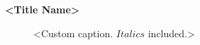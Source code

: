
\begin{center}
\Large\textbf{<Title Name>}
\end{center}


\large{
\begin{figure}[htbp]
    \centering
    
    \caption{<Custom caption. $Italics$ included.>}
    \label{fig:svgImage}
\end{figure}
}